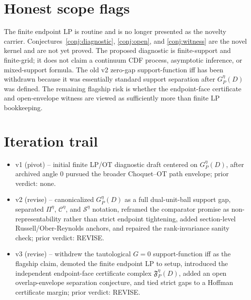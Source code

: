 \documentclass[11pt]{article}
\theoremstyle{definition}
\theoremstyle{plain}
\theoremstyle{remark}
\begin{document}
\section{Honest scope flags}
The finite endpoint LP is routine and is no longer presented as the novelty
carrier.  Conjectures~\ref{conj:diagnostic}, \ref{conj:open}, and
\ref{conj:witness} are the novel kernel and are not yet proved.  The proposed
diagnostic is finite-support and finite-grid; it does not claim a continuum CDF
process, asymptotic inference, or mixed-support formula.  The old v2 zero-gap
support-function iff has been withdrawn because it was essentially standard
support separation after \(G^\eta_P(D)\) was defined.  The remaining flagship
risk is whether the endpoint-face certificate and open-envelope witness are
viewed as sufficiently more than finite LP bookkeeping.

\section{Iteration trail}
\begin{itemize}[leftmargin=*]
\item v1 (pivot) -- initial finite LP/OT diagnostic draft centered on
\(G^\eta_P(D)\), after archived angle 0 pursued the broader Choquet--OT path
envelope; prior verdict: none.
\item v2 (revise) -- canonicalized \(G^\eta_P(D)\) as a full dual-unit-ball
support gap, separated \(\Pi^\eta\), \(\mathcal C^\eta\), and
\(\mathcal S^\eta\) notation, reframed the comparator promise as
non-representability rather than strict endpoint tightening, added
section-level Russell/Ober-Reynolds anchors, and repaired the rank-invariance
sanity check; prior verdict: REVISE.
\item v3 (revise) -- withdrew the tautological \(G=0\) support-function iff as
the flagship claim, demoted the finite endpoint LP to setup, introduced the
independent endpoint-face certificate complex \(\mathfrak F^\eta_P(D)\), added an
open overlap-envelope separation conjecture, and tied strict gaps to a Hoffman
certificate margin; prior verdict: REVISE.
\end{itemize}
\end{document}
